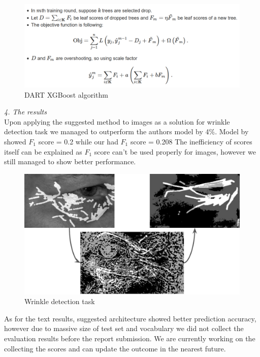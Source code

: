 \documentclass[jou,apacite]{apa6}
\begin{document}
\begin{figure}
    \centering
    \includegraphics[scale=0.3]{dart.PNG}
    \caption{DART XGBoost algorithm}
    \label{fig:my_label}
\end{figure}
\emph{\large{4. The results}}\\
Upon applying the suggested method to images as a solution for wrinkle detection task we managed to outperform the authors model by 4\%. Model by ~\cite{Gong} showed $F_1$ score = 0.2 while our had $F_1$ score = 0.208 The inefficiency of scores itself can be explained as $F_1$ score can't be used properly for images, however we still managed to show better performance.\\ 
\begin{figure}
    \centering
    \includegraphics[scale=0.3]{eye.PNG}
    \caption{Wrinkle detection task}
    \label{fig:my_label}
\end{figure}
As for the text results, suggested architecture showed better prediction accuracy, however due to massive size of test set and  vocabulary we did not collect the evaluation results before the report submission. We are currently working on the collecting the scores and can update the outcome in the nearest future.\\




\end{document}

